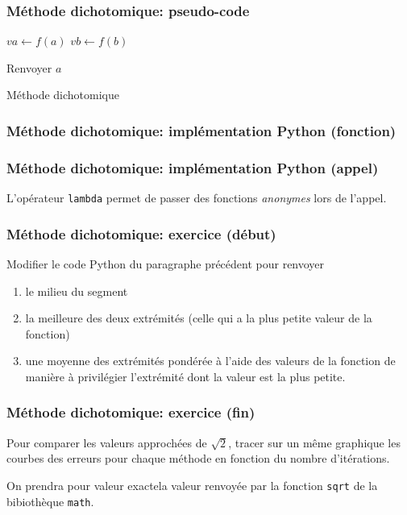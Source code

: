 \begin{frame}
  \frametitle{Méthode dichotomique: pseudo-code}
\begin{algorithm}[H]
  
  $va\leftarrow f(a)$   $vb\leftarrow f(b)$\;
  
  Renvoyer $a$\;
  \caption{Méthode dichotomique}
  \label{resolnumequ_1}
\end{algorithm}
\end{frame}

\begin{frame}
  \frametitle{Méthode dichotomique: implémentation Python (fonction) }

\end{frame}

\begin{frame}
  \frametitle{Méthode dichotomique: implémentation Python (appel) }

L'opérateur \texttt{lambda} permet de passer des fonctions \emph{anonymes} lors de l'appel.


\end{frame}

\begin{frame}
  \frametitle{Méthode dichotomique: exercice (début)}
Modifier le code Python du paragraphe précédent pour renvoyer
\begin{enumerate}
  \item le milieu du segment
  \item la meilleure des deux extrémités (celle qui a la plus petite valeur de la fonction)
  \item une moyenne des extrémités pondérée à l'aide des valeurs de la fonction de manière à privilégier l'extrémité dont la valeur est la plus petite.
\end{enumerate}
\end{frame}

\begin{frame}[fragile]
  \frametitle{Méthode dichotomique: exercice (fin)}

Pour comparer les valeurs approchées de $\sqrt{2}$, tracer sur un même graphique les courbes des erreurs pour chaque méthode en fonction du nombre d'itérations.

On prendra pour valeur \og exacte\fg la valeur renvoyée par la fonction \texttt{sqrt} de la bibiothèque \texttt{math}.
\end{frame}

